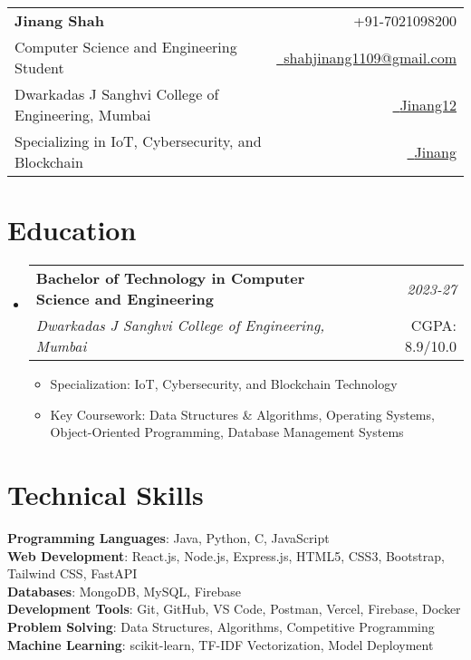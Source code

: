 \documentclass[a4paper,11pt]{article}
\makeatletter
\newcommand{\resumeSubheading}[4]{
\vspace{0.5mm}\item
    \begin{tabular*}{0.98\textwidth}[t]{l@{\extracolsep{\fill}}r}
        \textbf{#1} & \textit{\footnotesize{#4}} \\
        \textit{\footnotesize{#3}} &  \footnotesize{#2}\\
    \end{tabular*}
    \vspace{-2.4mm}
}
\newcommand{\resumeSubHeadingListStart}{\begin{itemize}[leftmargin=*,labelsep=0mm]}
\newcommand{\resumeItemListStart}{\begin{justify}\begin{itemize}[leftmargin=3ex, rightmargin=2ex, noitemsep,labelsep=1.2mm,itemsep=0mm]\small}
\newcommand{\resumeSubHeadingListEnd}{\end{itemize}\vspace{2mm}}
\newcommand{\resumeItemListEnd}{\end{itemize}\end{justify}\vspace{-2mm}}
\makeatother
\begin{document}
\selectfont

{
\begin{tabularx}{\linewidth}{L r} \\
  \textbf{\Large Jinang Shah} & {\raisebox{0.0\height}{\footnotesize \faPhone}\ +91-7021098200}\\
  {Computer Science and Engineering Student} & \href{mailto:shahjinang1109@gmail.com}{\raisebox{0.0\height}{\footnotesize \faEnvelope}\ {shahjinang1109@gmail.com}} \\
  {Dwarkadas J Sanghvi College of Engineering, Mumbai} & \href{https://github.com/Jinang12}{\raisebox{0.0\height}{\footnotesize \faGithub}\ {Jinang12}} \\  
  {Specializing in IoT, Cybersecurity, and Blockchain} & \href{https://www.linkedin.com/in/jinang-shah-9292082b6//}{\raisebox{0.0\height}{\footnotesize \faLinkedin}\ {Jinang}}
\end{tabularx}
}
\vspace{-1pt}

\section{\textbf{Education}}
  \resumeSubHeadingListStart
    \resumeSubheading
      {Bachelor of Technology in Computer Science and Engineering}{CGPA: 8.9/10.0}
      {Dwarkadas J Sanghvi College of Engineering, Mumbai}{2023-27}
      \resumeItemListStart
        \item {Specialization: IoT, Cybersecurity, and Blockchain Technology}
        \item {Key Coursework: Data Structures \& Algorithms, Operating Systems, Object-Oriented Programming, Database Management Systems}
      \resumeItemListEnd
  \resumeSubHeadingListEnd
\vspace{-3pt}

\section{\textbf{Technical Skills}}
\begin{itemize}[leftmargin=0.05in, label={}]
    \small{\item{
    \textbf{Programming Languages}{: Java, Python, C, JavaScript} \\
    \textbf{Web Development}{: React.js, Node.js, Express.js, HTML5, CSS3, Bootstrap, Tailwind CSS, FastAPI} \\
    \textbf{Databases}{: MongoDB, MySQL, Firebase} \\
    \textbf{Development Tools}{: Git, GitHub, VS Code, Postman, Vercel, Firebase, Docker} \\
    \textbf{Problem Solving}{: Data Structures, Algorithms, Competitive Programming} \\
    \textbf{Machine Learning}{: scikit-learn, TF-IDF Vectorization, Model Deployment} \\
    }}
\end{itemize}
\vspace{-3pt}
\end{document}

